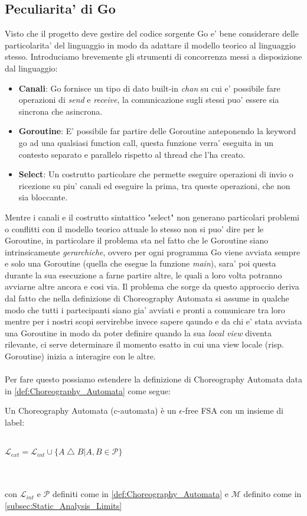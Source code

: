 \subsection{Peculiarita' di Go}
Visto che il progetto deve gestire del codice sorgente Go e' bene considerare delle particolarita' del linguaggio in modo da adattare il modello teorico al linguaggio stesso. Introduciamo brevemente gli strumenti di concorrenza messi a disposizione dal linguaggio:
\begin{itemize}
    \item \textbf{Canali}: Go fornisce un tipo di dato built-in \emph{chan} su cui e' possibile fare operazioni di \emph{send} e \emph{receive}, la comunicazione sugli stessi puo' essere sia sincrona che asincrona.
    \item \textbf{Goroutine}: E' possibile far partire delle Goroutine anteponendo la keyword go ad una qualsiasi function call, questa funzione verra' eseguita in un contesto separato e parallelo rispetto al thread che l'ha creato.
    \item \textbf{Select}: Un costrutto particolare che permette eseguire operazioni di invio o ricezione su piu' canali ed eseguire la prima, tra queste operazioni, che non sia bloccante.
\end{itemize}
Mentre i canali e il costrutto sintattico "select" non generano particolari problemi o conflitti con il modello teorico attuale lo stesso non si puo' dire per le Goroutine, in particolare il problema sta nel fatto che le Goroutine siano intrinsicamente \emph{gerarchiche}, ovvero per ogni programma Go viene avviata sempre e solo una Goroutine (quella che esegue la funzione \emph{main}), sara' poi questa durante la sua esecuzione a farne partire altre, le quali a loro volta potranno avviarne altre ancora e cosi via.
Il problema che sorge da questo approccio deriva dal fatto che nella definizione di Choreography Automata si assume in qualche modo che tutti i partecipanti siano gia' avviati e pronti a comunicare tra loro mentre per i nostri scopi servirebbe invece sapere qaundo e da chi e' stata avviata una Goroutine in modo da poter definire quando la sua \emph{local view} diventa rilevante, ci serve determinare il momento esatto in cui una view locale (risp. Goroutine) inizia a interagire con le altre.\\\\
Per fare questo possiamo estendere la definizione di Choreography Automata data in \ref{def:Choreography_Automata} come segue:
\begin{definition}
    Un Choreography Automata (c-automata) è un $\epsilon$-free FSA con un insieme di label:\\\\
    \centerline{
        $\mathcal{L}_{ext} = \mathcal{L}_{int} \cup \{ A \bigtriangleup B | A, B \in \mathcal{P}\}$
    }\\\\
    con $\mathcal{L}_{int}$ e $\mathcal{P}$ definiti come in \ref{def:Choreography_Automata} e $\mathcal{M}$ definito come in \ref{subsec:Static_Analysis_Limits}
\end{definition}